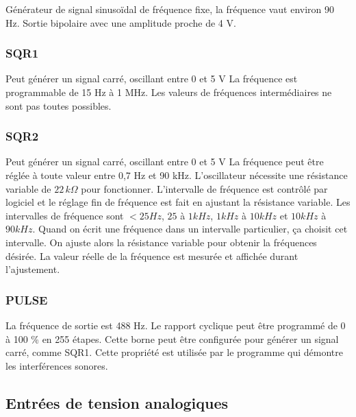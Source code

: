\documentclass{book}
\begin{document}
Générateur de signal sinusoïdal de fréquence fixe, la fréquence vaut environ 90 Hz. Sortie bipolaire avec une amplitude proche de 4 V.




\subsubsection{SQR1}





Peut générer un signal carré, oscillant entre 0 et 5 V La fréquence est programmable de 15 Hz à 1 MHz. Les valeurs de fréquences intermédiaires ne sont pas toutes possibles.




\subsubsection{SQR2}





Peut générer un signal carré, oscillant entre 0 et 5 V La fréquence peut être réglée à toute valeur entre 0,7 Hz et 90 kHz. L'oscillateur nécessite une résistance variable de $22\, k\Omega$ pour fonctionner. L'intervalle de fréquence est contrôlé par logiciel et le réglage fin de fréquence est fait en ajustant la résistance variable. Les intervalles de fréquence sont $< 25 Hz$, $25$ à $1 kHz$, $1 kHz$ à $10 kHz$ et $10 kHz$ à $90 kHz$. Quand on écrit une fréquence dans un intervalle particulier, ça choisit cet intervalle. On ajuste alors la résistance variable pour obtenir la fréquences désirée. La valeur réelle de la fréquence est mesurée et affichée durant l'ajustement.




\subsubsection{PULSE}





La fréquence de sortie est 488 Hz. Le rapport cyclique peut être programmé de 0 à 100 \%{} en 255 étapes. Cette borne peut être configurée pour générer un signal carré, comme SQR1. Cette propriété est utilisée par le programme qui démontre les interférences sonores.




\subsection{Entrées de tension analogiques}
\end{document}
